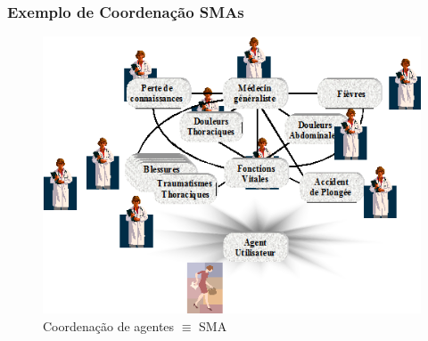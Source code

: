 \begin{frame}
\frametitle{Exemplo de Coordenação SMAs}

\begin{figure}[!ht]
\centering
\includegraphics[height =.6\textheight,width=.7\textwidth]{figuras/coordenacao_agentes02.png}
\caption{Coordenação de agentes $\equiv $   SMA}
\end{figure}
 
\end{frame}


